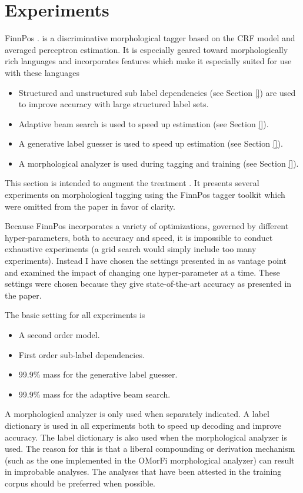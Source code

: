 \chapter{Experiments}
\label{chapter:finnpos}
FinnPos \citep{Silfverberg2015}.  is a discriminative morphological
tagger based on the CRF model and averaged perceptron estimation. It
is especially geared toward morphologically rich languages and
incorporates features which make it especially suited for use
with these languages

\begin{itemize}
\item Structured and unstructured sub label dependencies (see Section \ref{}) are used to improve accuracy with large structured label sets.
\item Adaptive beam search is used to speed up estimation (see Section \ref{}).
\item A generative label guesser is used to speed up estimation (see Section \ref{}).
\item A morphological analyzer is used during tagging and training (see Section \ref{}).
\end{itemize}

This section is intended to augment the treatment
\cite{Silfverberg2015}. It presents several experiments on
morphological tagging using the FinnPos tagger toolkit which were
omitted from the paper in favor of clarity.

Because FinnPos incorporates a variety of optimizations, governed by
different hyper-parameters, both to accuracy and speed, it is
impossible to conduct exhaustive experiments (a grid search would
simply include too many experiments). Instead I have chosen the
settings presented in \cite{Silfverberg2015} as vantage point and
examined the impact of changing one hyper-parameter at a time. These
settings were chosen because they give state-of-the-art accuracy as
presented in the paper. 

The basic setting for all experiments is 
\begin{itemize}
\item A second order model.
\item First order sub-label dependencies.
\item 99.9\% mass for the generative label guesser.
\item 99.9\% mass for the adaptive beam search.
\end{itemize}
A morphological analyzer is only used when separately indicated. A
label dictionary is used in all experiments both to speed up decoding
and improve accuracy. The label dictionary is also used when the
morphological analyzer is used. The reason for this is that a liberal
compounding or derivation mechanism (such as the one implemented in
the OMorFi morphological analyzer) can result in improbable
analyses. The analyses that have been attested in the training corpus
should be preferred when possible.

